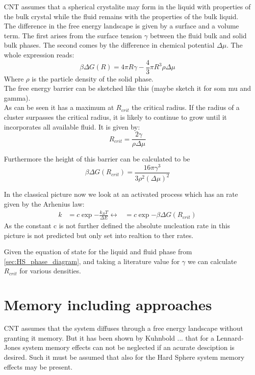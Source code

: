 CNT assumes that a spherical crystalite may form in the liquid with properties of the bulk crystal while the fluid remains with the properties of the bulk liquid. The difference in the free energy landscape is given by a surface and a volume term. The first arises from the surface tension $\gamma$ between the fluid bulk and solid bulk phases. The second comes by the difference in chemical potential $\Delta \mu$. The whole expression reads:
\begin{equation}
\beta \Delta G(R) =4 \pi R \gamma -\frac{4}{3} \pi R^3 \rho \Delta \mu  
\end{equation}
Where $\rho$ is the particle density of the solid phase.\\

The free energy barrier can be sketched like this (maybe sketch it for som mu and gamma).\\

As can be seen it has a maximum at $R_{crit}$ the critical radius. If the radius of a cluster surpasses the critical radius, it is likely to continue to grow until it incorporates all available fluid. It is given by:
\begin{equation}
R_{crit} = \frac{2 \gamma}{\rho \Delta \mu }
\end{equation}

Furthermore the height of this barrier can be calculated to be 
\begin{equation}
\beta \Delta G (R_{crit}) = \frac{16 \pi \gamma^3}{3 \rho^2 (\Delta \mu )^2}
\end{equation}

In the classical picture now we look at an activated process which has an rate given by the Arhenius law:
\begin{align}
k&=c \exp{-\frac{k_B T}{\Delta E}}
\leftrightarrow &=c \exp{-\beta \Delta G (R_{crit})}
\end{align}
As the constant c is not further defined the absolute nucleation rate in this picture is not predicted but only set into realtion to ther rates. 

Given the equation of state for the liquid and fluid phase from \autoref{sec:HS_phase_diagram}, and taking a literature value for $\gamma$  we can calculate $R_{crit}$ for various densities.


\section{Memory including approaches}
\label{sec:memory_approach}
CNT assumes that the system diffuses through a free energy landscape without granting it memory. But it has been shown by Kuhnbold ...  that for a Lennard-Jones system memory effects can not be neglected if an acurate  desciption is desired. Such it must be assumed that also for the Hard Sphere system memory effects may be present.


